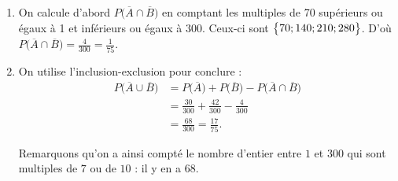 {\begin{enumerate}
		D'une part, les multiples de $10$ s'écrivent
			\begin{align*}
				10 \times 1 && 10 \times 2 && 10 \times 3 && \dots && 10 \times 30 = 300,
			\end{align*}
		et donc $|\overline{A}| = 30$, et $P\left( \overline{A} \right) = \frac{30}{300} = \frac1{10}$.
		
		D'autre part, les multiples de $7$ s'écrivent
			\begin{align*}
				7 \times 1 && 7\times 2 && 7 \times 3 && \dots
			\end{align*}
		Pour savoir jusqu'où aller, on calcule $\frac{300}{7} \approx 42,86$, donc la liste s'arrête à $7 \times 42 = 294$.
		Par conséquent, $|\overline{B}| = 42$, et $P\left( \overline{B} \right) = \frac{42}{300} = \frac{7}{50}$ (pas exactement un septième, donc !).
		
		\item 
		On calcule d'abord $P\bigl(\overline{A} \cap \overline{B}\bigr)$ en comptant les multiples de 70 supérieurs ou égaux à 1 et inférieurs ou égaux à $300$.
		Ceux-ci sont $\bigl\{  70 ; 140 ; 210 ; 280  \bigr\}$.
		D'où $P\bigl(\overline{A} \cap \overline{B}\bigr) = \frac{4}{300} = \frac{1}{75}$.
		
		\item
		On utilise l'inclusion-exclusion pour conclure :
			\begin{align*}
				P\bigl(\overline{A} \cup \overline{B}\bigr) &= P\bigl( \overline{A} \bigr) + P\bigl( \overline{B} \bigr) - P\bigl(\overline{A} \cap \overline{B}\bigr) \\
																&= \frac{30}{300} + \frac{42}{300} -  \frac{4}{300} \\
																&= \frac{68}{300} = \frac{17}{75}.
			\end{align*}
	
		Remarquons qu'on a ainsi compté le nombre d'entier entre $1$ et $300$ qui sont multiples de $7$ ou de $10$ : il y en a $68$.

	\end{enumerate}

}


